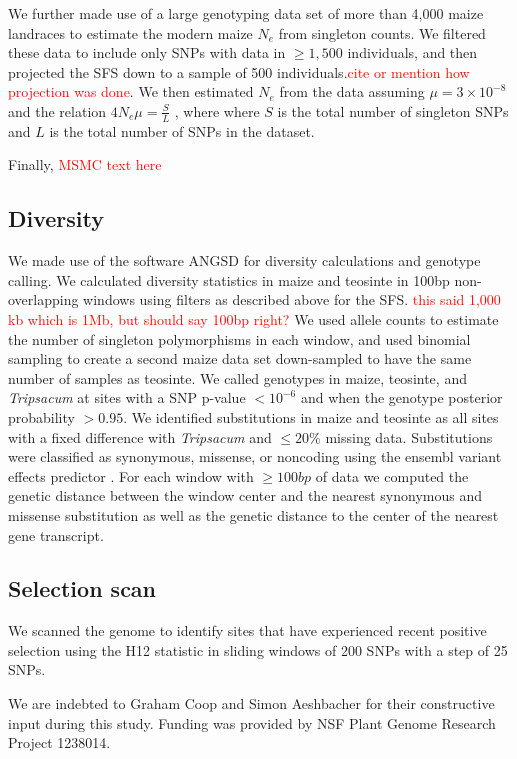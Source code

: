 \documentclass{pnastwo}
\newcommand{\jri}[1]{\textcolor{red}{\scriptsize #1}}
\begin{document}
\begin{article}
\begin{materials}
We further made use of a large genotyping data set of more than 4,000 maize landraces \cite{Hearne2015} to estimate the modern maize $N_e$ from singleton counts.
We filtered these data to include only SNPs with data in $\geq 1,500$ individuals, and then projected the SFS down to a sample of 500 individuals.\jri{cite or mention how projection was done}. 
We then estimated $N_e$ from the data assuming $\mu = 3 \times 10^{-8}$ \cite{clark2005} and the relation  $4N_e\mu = \frac{S}{L}$ \cite{fu1993}, where where $S$ is the total number of singleton SNPs and $L$ is the total number of SNPs in the dataset.

Finally, \jri{MSMC text here}

\subsection{Diversity}
We made use of the software ANGSD \cite{korneliussen2014} for diversity calculations and genotype calling. 
We calculated diversity statistics in maize and teosinte in 100bp non-overlapping windows using filters as described above for the SFS. \jri{this said 1,000 kb which is 1Mb, but should say 100bp right?}
We used allele counts to estimate the number of singleton polymorphisms in each window, and used binomial sampling to create a second maize data set down-sampled to have the same number of samples as teosinte.
We called genotypes in maize, teosinte, and \emph{Tripsacum} at sites with a SNP p-value $<10^{-6}$ and when the genotype posterior probability $>0.95$.
We identified substitutions in maize and teosinte as all sites with a fixed difference with \emph{Tripsacum} and $\leq 20\%$ missing data. 
Substitutions were classified as synonymous, missense, or noncoding using the ensembl variant effects predictor \cite{mclaren2010}.
For each window with $\geq 100bp$ of data we computed the genetic distance between the window center and the nearest synonymous and missense substitution as well as the genetic distance to the center of the nearest gene transcript.  

\subsection{Selection scan}
We scanned the genome to identify sites that have experienced recent positive selection using the H12 statistic \cite{garud2015} in sliding windows of 200 SNPs with a step of 25 SNPs.


\end{materials}

\begin{acknowledgments}
We are indebted to Graham Coop and Simon Aeshbacher for their constructive input during this study. Funding was provided by NSF Plant Genome Research Project 1238014.
\end{acknowledgments}



\onecolumn
 


\end{article}
\end{document}
